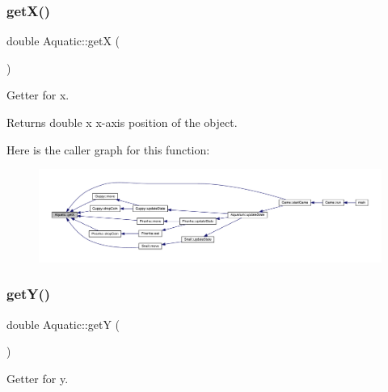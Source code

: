\subsubsection{\texorpdfstring{get\+X()}{getX()}}
{\footnotesize\ttfamily double Aquatic\+::getX (\begin{DoxyParamCaption}{ }\end{DoxyParamCaption})}



Getter for x. 

\begin{DoxyReturn}{Returns}
double x x-\/axis position of the object. 
\end{DoxyReturn}
Here is the caller graph for this function\+:\nopagebreak
\begin{figure}[H]
\begin{center}
\leavevmode
\includegraphics[width=350pt]{class_aquatic_ab59ba97a4876a0e3ae8b85c1915a82f9_icgraph}
\end{center}
\end{figure}
\mbox{\label{class_aquatic_aadfede87649072d59192d923200b6fc3}} 
\subsubsection{\texorpdfstring{get\+Y()}{getY()}}
{\footnotesize\ttfamily double Aquatic\+::getY (\begin{DoxyParamCaption}{ }\end{DoxyParamCaption})}



Getter for y. 

